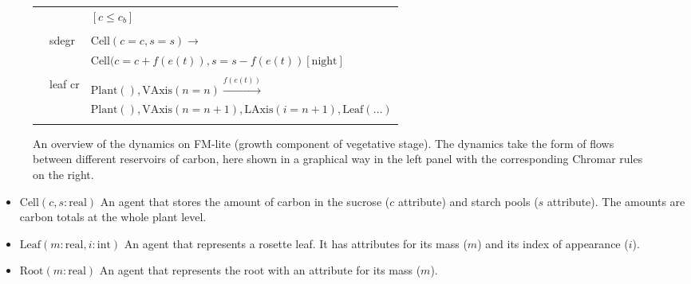 \documentclass[phd]{infthesis}
\begin{document}
\begin{figure}[!ht]
\begin{tabularx}{0.95\textwidth}{c|ll}
& & $[c \leq c_b]$ \\
& & \\
& \textsf{sdegr} & $\mathrm{Cell}(c=c, s=s) \xrightarrow{}$ \\ 
& & $\mathrm{Cell}(c=c+f(e(t)), s=s-f(e(t)) [\mathrm{night}]$ \\ 
& & \\
& \textsf{leaf cr} & $\mathrm{Plant}(), \mathrm{VAxis}(n=n) \xrightarrow{f(e(t))} $ \\ 
& & $\mathrm{Plant}(), \mathrm{VAxis}(n=n+1), \mathrm{LAxis}(i=n+1), \mathrm{Leaf}(\dots)$ \\
\addlinespace[0.25cm]
\bottomrule
\end{tabularx} %
\caption{An overview of the dynamics on FM-lite (growth component of vegetative stage). The dynamics take the form of flows between different reservoirs of carbon, here shown in a graphical way in the left panel with the corresponding Chromar rules on the right.  }
\label{fig:fmv1}
\end{figure}

\begin{itemize}
\item
  \(\text{Cell}(c,s:\text{real})\) An agent that stores the amount of
  carbon in the sucrose (\(c\) attribute) and starch pools (\(s\)
  attribute). The amounts are carbon totals at the whole plant level.
\item
  \(\text{Leaf}(m:\text{real},i:\text{int})\) An agent that represents a
  rosette leaf. It has attributes for its mass (\(m\)) and its index of
  appearance (\(i\)).
\item
  \(\text{Root}(m:\text{real})\) An agent that represents the root with
  an attribute for its mass (\(m\)).
\end{itemize}
\end{document}
